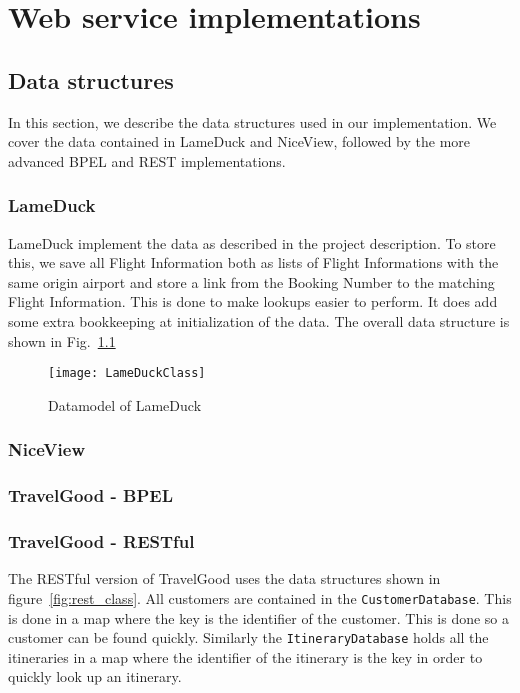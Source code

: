 {\setlength{\chapterfontsize}{23pt}
\chapter{Web service implementations}
}

\section{Data structures}
In this section, we describe the data structures used in our implementation. We cover the data contained in LameDuck and NiceView, followed by the more advanced BPEL and REST implementations.

\subsection{LameDuck}
LameDuck implement the data as described in the project description. To store this, we save all Flight Information both as lists of Flight Informations with the same origin airport and store a link from the Booking Number to the matching Flight Information. This is done to make lookups easier to perform. It does add some extra bookkeeping at initialization of the data. The overall data structure is shown in Fig.~\ref{fig:lameduck_class}

\begin{figure}[H]
\centering
\texttt{[image: LameDuckClass]}
\caption{Datamodel of LameDuck}
\label{fig:lameduck_class}
\end{figure}

\subsection{NiceView}
\subsection{TravelGood - BPEL}

\subsection{TravelGood - RESTful}
The RESTful version of TravelGood uses the data structures shown in figure~\ref{fig:rest_class}. All customers are contained in the \texttt{CustomerDatabase}. This is done in a map where the key is the identifier of the customer. This is done so a customer can be found quickly. Similarly the \texttt{ItineraryDatabase} holds all the itineraries in a map where the identifier of the itinerary is the key in order to quickly look up an itinerary.

